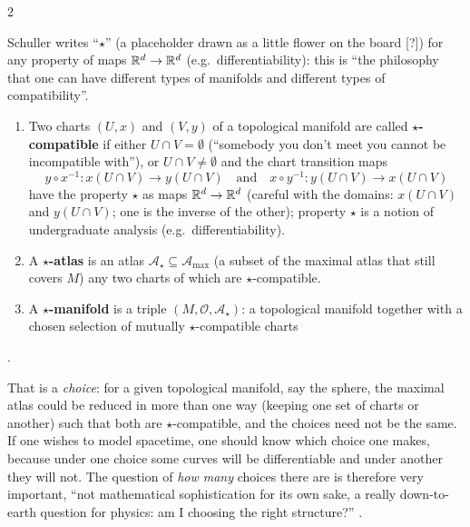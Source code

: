 \begin{paracol}{2}
\begin{definition}\label{def:c04-compatible}
Schuller writes ``$\star$'' (a placeholder drawn as a little flower on the board [?]) for any property of maps $\mathbb{R}^d\to\mathbb{R}^d$ (e.g.\ differentiability): this is ``the philosophy that one can have different types of manifolds and different types of compatibility''.
\begin{enumerate}
  \item Two charts $(U,x)$ and $(V,y)$ of a topological manifold are called \textbf{$\star$-compatible} if either $U\cap V=\emptyset$ (``somebody you don't meet you cannot be incompatible with''), or $U\cap V\neq\emptyset$ and the chart transition maps
        \[
          y\circ x^{-1}\colon x(U\cap V)\to y(U\cap V)\quad\text{and}\quad x\circ y^{-1}\colon y(U\cap V)\to x(U\cap V)
        \]
        have the property $\star$ as maps $\mathbb{R}^d\to\mathbb{R}^d$ (careful with the domains: $x(U\cap V)$ and $y(U\cap V)$; one is the inverse of the other); property $\star$ is a notion of undergraduate analysis (e.g.\ differentiability).
  \item A \textbf{$\star$-atlas} is an atlas $\mathcal A_\star\subseteq\mathcal A_{\max}$ (a subset of the maximal atlas that still covers $M$) any two charts of which are $\star$-compatible.
  \item A \textbf{$\star$-manifold} is a triple $(M,\mathcal O,\mathcal A_\star)$: a topological manifold together with a chosen selection of mutually $\star$-compatible charts
\end{enumerate}
.
\end{definition}
That is a \emph{choice}: for a given topological manifold, say the sphere, the maximal atlas could be reduced in more than one way (keeping one set of charts or another) such that both are $\star$-compatible, and the choices need not be the same. If one wishes to model spacetime, one should know which
choice one makes, because under one choice some curves will be differentiable and under another they will not. The question of \emph{how many} choices there are is therefore very important, ``not mathematical sophistication for its own sake, a really down-to-earth question for physics: am I choosing the right structure?''
.


\end{paracol}
